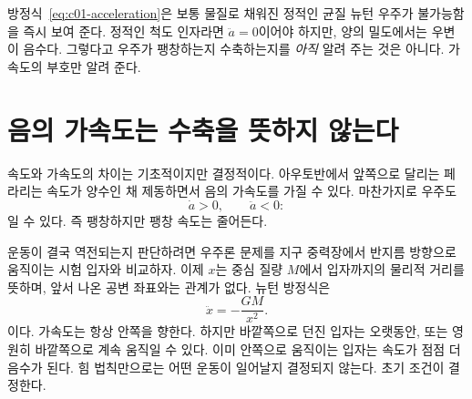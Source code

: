 \begin{classroomqa}\end{classroomqa}

방정식~\eqref{eq:c01-acceleration}은 보통 물질로 채워진 정적인 균질 뉴턴 우주가 불가능함을 즉시 보여 준다. 정적인 척도 인자라면 \(\ddot a=0\)이어야 하지만, 양의 밀도에서는 우변이 음수다. 그렇다고 우주가 팽창하는지 수축하는지를 \emph{아직} 알려 주는 것은 아니다. 가속도의 부호만 알려 준다.

\section{음의 가속도는 수축을 뜻하지 않는다}

속도와 가속도의 차이는 기초적이지만 결정적이다. 아우토반에서 앞쪽으로 달리는 페라리는 속도가 양수인 채 제동하면서 음의 가속도를 가질 수 있다. 마찬가지로 우주도 \begin{equation}
\dot a>0,
\qquad
\ddot a<0:
\end{equation}일 수 있다. 즉 팽창하지만 팽창 속도는 줄어든다.

운동이 결국 역전되는지 판단하려면 우주론 문제를 지구 중력장에서 반지름 방향으로 움직이는 시험 입자와 비교하자. 이제 \(x\)는 중심 질량 \(M\)에서 입자까지의 물리적 거리를 뜻하며, 앞서 나온 공변 좌표와는 관계가 없다. 뉴턴 방정식은 \begin{equation}
\ddot x=-\frac{GM}{x^2}.
\label{eq:c01-particle-force}
\end{equation}이다. 가속도는 항상 안쪽을 향한다. 하지만 바깥쪽으로 던진 입자는 오랫동안, 또는 영원히 바깥쪽으로 계속 움직일 수 있다. 이미 안쪽으로 움직이는 입자는 속도가 점점 더 음수가 된다. 힘 법칙만으로는 어떤 운동이 일어날지 결정되지 않는다. 초기 조건이 결정한다.

\begin{classroomqa}\end{classroomqa}

